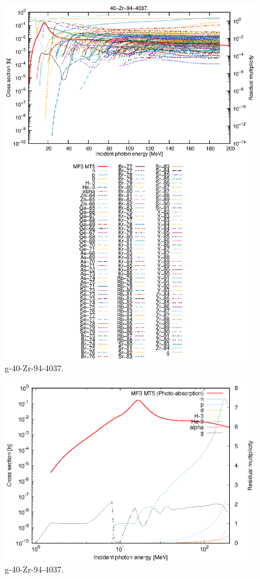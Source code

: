 \begin{figure}
 \includegraphics[width=\linewidth]{eps/g_40-Zr-94_4037.eps}
  \caption{g-40-Zr-94-4037.}
\end{figure}
\newpage \clearpage

\begin{figure}
 \includegraphics[width=\linewidth]{eps-log/g_40-Zr-94_4037.eps}
 \caption{g-40-Zr-94-4037.}
\end{figure}
\newpage \clearpage

